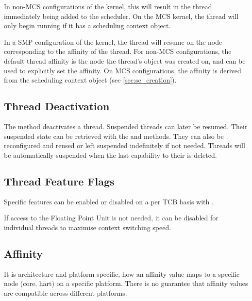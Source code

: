 In non-MCS configurations of the kernel, this will result in the thread immediately being added to
the scheduler. On the MCS kernel, the thread will only begin running if it has a
scheduling context object.

In a SMP configuration of the kernel, the thread will resume on the node
corresponding to the affinity of the thread. For non-MCS configurations, the
default thread affinity is the node the thread's  object was created
on, and  can be used to
explicitly set the affinity. On MCS configurations, the affinity is derived
from the scheduling context object (see \autoref{sec:sc_creation}).

\subsection{Thread Deactivation}
\label{sec:thread_deactivation}

The  method deactivates a thread.
Suspended threads can later be resumed.
Their suspended state can be retrieved with the
 and
 methods.
They can also be reconfigured and
reused or left suspended indefinitely if not needed. Threads will be
automatically suspended when the last capability to their  is
deleted.

\subsection{Thread Feature Flags}
\label{sec:thread_flags}
Specific features can be enabled or disabled on a per TCB basis with
.

If access to the Floating Point Unit is not needed, it can be disabled
for individual threads to maximise context switching speed.

\subsection{Affinity}
\label{sec:thread_affinity}

It is architecture and platform specific, how an affinity value maps to a
specific node (core, hart) on a specific platform. There is no guarantee that
affinity values are compatible across different platforms.


